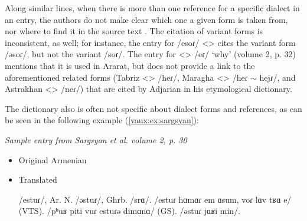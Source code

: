 \documentclass[output=paper]{langscibook}
\begin{document}
Along similar lines, when there is more than one reference for a specific dialect in an entry, the authors do not make clear which one a given form is taken from, nor   where to find it in the source text . The citation of variant forms is inconsistent, as well; for instance, the entry for /esoɾ/ <>   cites the variant form  /əsoɾ/, but not the variant /soɾ/.  The entry for <> /eɾ/ `why'  (volume 2, p. 32)   mentions that it is used in Ararat, but does not provide a link to the aforementioned related forms (Tabriz <> /heɾ/, Maragha <> /heɾ $\sim$  hejɾ/, and Astrakhan <> /neɾ/) that are cited by Adjarian  in his etymological dictionary.

The dictionary also is often not specific about dialect forms and references, as can be seen in the following example (\ref{vaux:ex:sargsyan}):

\begin{exe}
    \ex \textit{Sample entry from Sargsyan et al. volume 2, p. 30 \citep{Sargsyan-2012-DialectalDictionary}} \label{vaux:ex:sargsyan}
    \begin{itemize}
        \item Original Armenian


\item Translated

	/estuɾ/, Ar. N. /əstuɾ/, Ghrb. /srɑ/. /estuɾ hɑmɑɾ em ɑsum, voɾ lɑv tʁɑ e/ (VTS). /pʰuʁ piti vuɾ estuɾə dimɑnɑ/ (GS). /əstuɾ jɑʁi min/.

    \end{itemize}
\end{exe}
\end{document}
